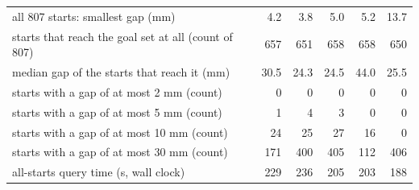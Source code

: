 \begin{tabular}{@{}>{\raggedright\arraybackslash}p{6.2cm} rrrrr@{}}
\midrule
all 807 starts: smallest gap (mm) & 4.2 & 3.8 & 5.0 & 5.2 & 13.7 \\
starts that reach the goal set at all (count of 807) & 657 & 651 & 658 & 658 & 650 \\
median gap of the starts that reach it (mm) & 30.5 & 24.3 & 24.5 & 44.0 & 25.5 \\
starts with a gap of at most 2 mm (count) & 0 & 0 & 0 & 0 & 0 \\
starts with a gap of at most 5 mm (count) & 1 & 4 & 3 & 0 & 0 \\
starts with a gap of at most 10 mm (count) & 24 & 25 & 27 & 16 & 0 \\
starts with a gap of at most 30 mm (count) & 171 & 400 & 405 & 112 & 406 \\
all-starts query time (s, wall clock) & 229 & 236 & 205 & 203 & 188 \\
\bottomrule
\end{tabular}
